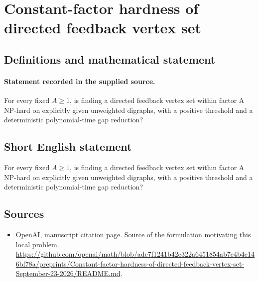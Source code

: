 \documentclass[11pt]{article}
\begin{document}
\section*{Constant-factor hardness of directed feedback vertex set}\label{30007452}
\subsection{Definitions and mathematical statement}
\paragraph{Statement recorded in the supplied source.}
For every fixed $A\geq 1$, is finding a directed feedback vertex set within factor A NP-hard on explicitly given unweighted digraphs, with a positive threshold and a deterministic polynomial-time gap reduction?
\subsection{Short English statement}
For every fixed $A\geq 1$, is finding a directed feedback vertex set within factor A NP-hard on explicitly given unweighted digraphs, with a positive threshold and a deterministic polynomial-time gap reduction?
\subsection{Sources}
\begin{itemize}
\item[S1] OpenAI, manuscript citation page. Source of the formulation motivating this local problem.
\url{https://github.com/openai/math/blob/adc7f1241b42e322a6451854ab7e4b4c146bf78a/preprints/Constant-factor-hardness-of-directed-feedback-vertex-set-September-23-2026/README.md}.
\end{itemize}
\end{document}

